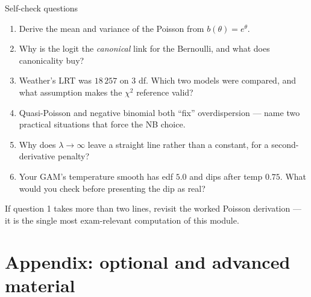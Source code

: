 \documentclass[aspectratio=169,11pt]{beamer}
\begin{document}
\begin{frame}{Self-check questions}
  \begin{readme}
    \begin{enumerate}
      \item Derive the mean and variance of the Poisson from $b(\theta) = e^{\theta}$.
      \item Why is the logit the \emph{canonical} link for the Bernoulli, and what
            does canonicality buy?
      \item Weather's LRT was $18\,257$ on $3$ df. Which two models were compared, and
            what assumption makes the $\chi^2$ reference valid?
      \item Quasi-Poisson and negative binomial both ``fix'' overdispersion --- name
            two practical situations that force the NB choice.
      \item Why does $\lambda\to\infty$ leave a straight line rather than a constant,
            for a second-derivative penalty?
      \item Your GAM's temperature smooth has edf $5.0$ and dips after temp $0.75$.
            What would you check before presenting the dip as real?
    \end{enumerate}
  \end{readme}
  \begin{takeaway}
    If question 1 takes more than two lines, revisit the worked Poisson derivation ---
    it is the single most exam-relevant computation of this module.
  \end{takeaway}
\end{frame}

\appendix
\AtBeginSection[]{}
\section{Appendix: optional and advanced material}
\end{document}
